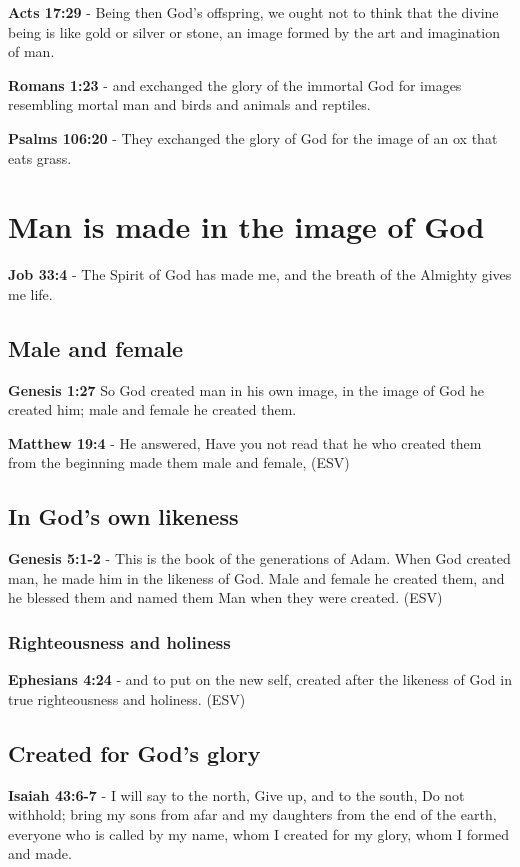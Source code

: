 \documentclass[11pt]{article}
\begin{document}
\textbf{Acts 17:29} - Being then God's offspring, we ought not to think that the divine being is like gold or silver or stone, an image formed by the art and imagination of man.

\textbf{Romans 1:23} - and exchanged the glory of the immortal God for images resembling mortal man and birds and animals and reptiles.􄐺

\textbf{Psalms 106:20} - They exchanged the glory of God for the image of an ox that eats grass.􂉢

\section{Man is made in the image of God}
\label{sec:orgff71d88}
\textbf{Job 33:4} - The Spirit of God has made me, and the breath of the Almighty gives me life.

\subsection{Male and female}
\label{sec:org8f2185b}
\textbf{Genesis 1:27} So God created man in his own image, in the image of God he created him; male and female he created them.

\textbf{Matthew 19:4} - He answered, Have you not read that he who created them from the beginning made them male and female, (ESV)

\subsection{In God's own likeness}
\label{sec:orgf54a51c}
\textbf{Genesis 5:1-2} -  This is the book of the generations of Adam.  When God created man, he made him in the likeness of God.  Male and female he created them, and he blessed them and named them Man when they were created.  (ESV)

\subsubsection{Righteousness and holiness}
\label{sec:orgee3de11}
\textbf{Ephesians 4:24} - and to put on the new self, created after the likeness of God in true righteousness and holiness. (ESV)

\subsection{Created for God's glory}
\label{sec:orgdc080fc}
\textbf{Isaiah 43:6-7} - I will say to the north, Give up, and to the south, Do not withhold; bring my sons from afar and my daughters from the end of the earth, everyone who is called by my name, whom I created for my glory, whom I formed and made.
\end{document}
